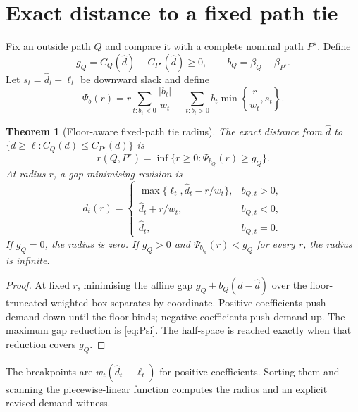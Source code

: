 \documentclass[11pt]{article}
\newtheorem{theorem}{Theorem}[section]
\theoremstyle{definition}
\newcommand{\dhat}{\widehat d}
\newcommand{\ellv}{\ell}
\begin{document}
\section{Exact distance to a fixed path tie}\label{sec:pairwise}

Fix an outside path $Q$ and compare it with a complete nominal path $P^\star$. Define
\begin{equation}\label{eq:gapb}
g_Q=C_Q(\dhat)-C_{P^\star}(\dhat)\ge0,
\qquad b_Q=\beta_Q-\beta_{P^\star}.
\end{equation}
Let $s_t=\dhat_t-\ellv_t$ be downward slack and define
\begin{equation}\label{eq:Psi}
\Psi_b(r)=
 r\sum_{t:b_t<0}\frac{|b_t|}{w_t}
 +\sum_{t:b_t>0}b_t\min\left\{\frac{r}{w_t},s_t\right\}.
\end{equation}

\begin{theorem}[Floor-aware fixed-path tie radius]\label{thm:pairwise}
The exact distance from $\dhat$ to $\{d\ge\ellv:C_Q(d)\le C_{P^\star}(d)\}$ is
\begin{equation}\label{eq:pairradius}
r(Q,P^\star)=\inf\{r\ge0:\Psi_{b_Q}(r)\ge g_Q\}.
\end{equation}
At radius $r$, a gap-minimising revision is
\begin{equation}\label{eq:worstrevision}
d_t(r)=
\begin{cases}
\max\{\ellv_t,\dhat_t-r/w_t\},&b_{Q,t}>0,\\
\dhat_t+r/w_t,&b_{Q,t}<0,\\
\dhat_t,&b_{Q,t}=0.
\end{cases}
\end{equation}
If $g_Q=0$, the radius is zero. If $g_Q>0$ and $\Psi_{b_Q}(r)<g_Q$ for every $r$, the radius is infinite.
\end{theorem}

\begin{proof}
At fixed $r$, minimising the affine gap $g_Q+b_Q^\top(d-\dhat)$ over the floor-truncated weighted box separates by coordinate. Positive coefficients push demand down until the floor binds; negative coefficients push demand up. The maximum gap reduction is \eqref{eq:Psi}. The half-space is reached exactly when that reduction covers $g_Q$.
\end{proof}

The breakpoints are $w_t(\dhat_t-\ellv_t)$ for positive coefficients. Sorting them and scanning the piecewise-linear function computes the radius and an explicit revised-demand witness.
\end{document}
